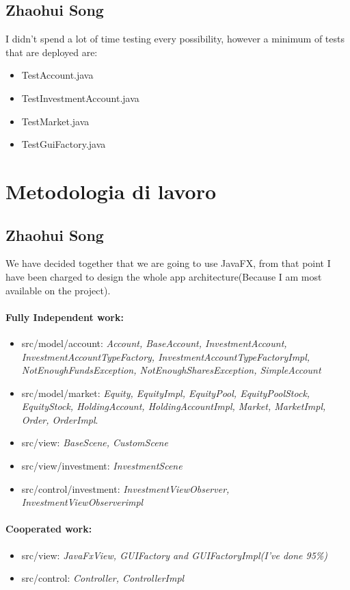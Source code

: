 \documentclass[a4paper,12pt]{report}
\begin{document}
\subsection{Zhaohui Song}
I didn't spend a lot of time testing every possibility, however a minimum of tests that are deployed are:
\begin{itemize}
	\item TestAccount.java
	\item TestInvestmentAccount.java
	\item TestMarket.java
	\item TestGuiFactory.java
\end{itemize}

\section{Metodologia di lavoro}
\subsection{Zhaohui Song}
We have decided together that we are going to use JavaFX, from that point I have been charged to design the whole app architecture(Because I am most available on the project).
\paragraph*{Fully Independent work:}
\begin{itemize}
	\item src/model/account: \textit{Account, BaseAccount, InvestmentAccount, 
	InvestmentAccountTypeFactory, InvestmentAccountTypeFactoryImpl, NotEnoughFundsException, NotEnoughSharesException, SimpleAccount}
	\item src/model/market: \textit{Equity, EquityImpl, EquityPool, EquityPoolStock,
	EquityStock, HoldingAccount, HoldingAccountImpl, Market, MarketImpl, Order, OrderImpl}.
	\item src/view: \textit{BaseScene, CustomScene}
	\item src/view/investment: \textit{InvestmentScene}
	\item src/control/investment: \textit{InvestmentViewObserver, InvestmentViewObserverimpl}
\end{itemize}

\paragraph*{Cooperated work:}
\begin{itemize}
	 \item src/view: \textit{JavaFxView, GUIFactory and GUIFactoryImpl(I've done 95\%)}
	 \item src/control: \textit{Controller, ControllerImpl}
\end{itemize}
\end{document}
